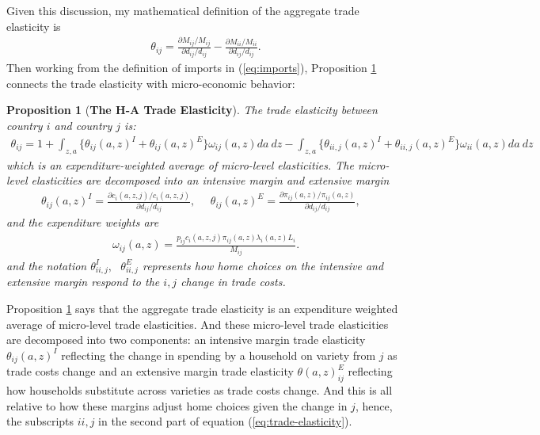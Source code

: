 \documentclass[12pt,pdftex]{article}
\newtheorem{prp}{Proposition}
\begin{document}
\begin{onehalfspacing}
Given this discussion, my mathematical definition of the aggregate trade elasticity is
\begin{align}
\theta_{ij} = \frac{\partial M_{ij} / M_{ij}}{\partial d_{ij} / d_{ij}}  - \frac{\partial M_{ii} / M_{ii}}{\partial d_{ij} / d_{ij}}.
\label{eq:def_trade_elasticity}
\end{align}
Then working from the definition of imports in (\ref{eq:imports}), Proposition \ref{prp:GET} connects the trade elasticity with micro-economic behavior:
\begin{prp}[\textbf{The H-A Trade Elasticity}] \label{prp:GET} The trade elasticity between country $i$ and country $j$ is:
{\footnotesize
\begin{align}
\theta_{ij} = 1 + \int_{z,a} \bigg \{ \theta_{ij}(a,z)^{I} + \theta_{ij}(a,z)^{E} \bigg \}\omega_{ij}(a,z)da \ dz - \int_{z,a} \bigg \{ \theta_{ii,j}(a,z)^{I} + \theta_{ii,j}(a,z)^{E} \bigg \}\omega_{ii}(a,z)da \ dz
\label{eq:trade-elasticity}
\end{align}
}which is an expenditure-weighted average of micro-level elasticities. The micro-level elasticities are decomposed into an intensive margin and extensive margin
{\footnotesize
\begin{align}
\nonumber
\theta_{ij}(a,z)^{I} = \frac{\partial c_{i}(a,z,j)/ c_{i}(a,z,j)}{\partial d_{ij} / d_{ij}}, \ \ \ \ \ \ \theta_{ij}(a,z)^{E} = \frac{\partial \pi_{ij}(a,z) / \pi_{ij}(a,z)}{\partial d_{ij} / d_{ij}}, \ \ \ \
\end{align}
}
and the expenditure weights are
{\footnotesize
\begin{align}
\nonumber
\omega_{ij}(a,z) = \frac{p_{ij}c_{i}(a,z,j)\pi_{ij}(a,z) \lambda_{i}(a,z) L_i}{M_{ij}}.
\end{align}
}
and the notation $\theta_{ii,j}^I,  \ \ \ \theta_{ii,j}^E $ represents how home choices on the intensive and extensive margin respond to the $i,j$ change in trade costs.
\end{prp}
Proposition \ref{prp:GET} says that the aggregate trade elasticity is an expenditure weighted average of micro-level trade elasticities. And these micro-level trade elasticities are decomposed into two components: an intensive margin trade elasticity $\theta_{ij}(a,z)^{I}$ reflecting the change in spending by a household on variety from $j$ as trade costs change and an extensive margin trade elasticity $\theta(a,z)_{ij}^{E}$ reflecting how households substitute across varieties as trade costs change. And this is all relative to how these margins adjust home choices given the change in $j$, hence, the subscripts $ii,j$ in the second part of equation (\ref{eq:trade-elasticity}).


\end{onehalfspacing}
\end{document}
